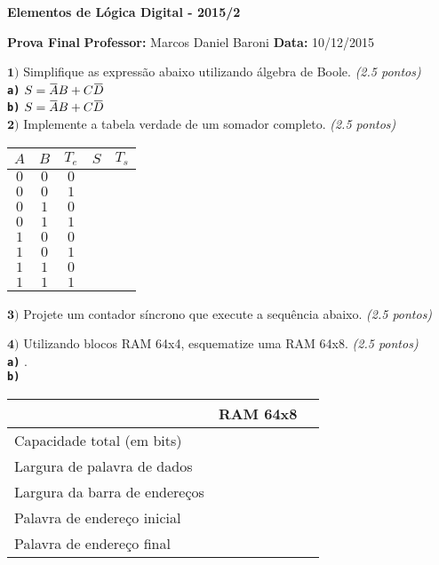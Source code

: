 \documentclass[12pt]{article}
\newcommand{\exerc}[3]{ \vspace*{25pt} {$\mathbf{#1)}$} #2 \hfill {\it #3} }
\newcommand{\exitem}[2]{ \texttt{\bf #1)} #2 \\ }
\renewcommand{\neg}[1]{ 
  \mkern 1.5mu\overline{\mkern-1.5mu#1\mkern-1.5mu}\mkern 1.5mu
}
\begin{document}

\begin{center}
{\Large \bf Elementos de Lógica Digital - 2015/2}
\end{center}
{\large \bf Prova Final}
{\bf Professor:} Marcos Daniel Baroni
{\bf Data:} 10/12/2015

\exerc{1}{Simplifique as expressão abaixo utilizando álgebra de Boole.}{(2.5 pontos)}
\\ \hspace*{3em} \exitem{a}{ $S = \neg{A}B + C\neg{D}$ }
   \hspace*{3em} \exitem{b}{ $S = \neg{A}B + C\neg{D}$ }

\exerc{2}{Implemente a tabela verdade de um somador completo.}{(2.5 pontos)}
\begin{multicols}{2}
  \begin{tabular}{|c|c|c||c|c|}
    \hline
    $A$ & $B$ & $T_e$ & $S$ & $T_s$ \\ \hline
    $0$ & $0$ & $0$ & & \\ \hline
    $0$ & $0$ & $1$ & & \\ \hline
    $0$ & $1$ & $0$ & & \\ \hline
    $0$ & $1$ & $1$ & & \\ \hline
    $1$ & $0$ & $0$ & & \\ \hline
    $1$ & $0$ & $1$ & & \\ \hline
    $1$ & $1$ & $0$ & & \\ \hline
    $1$ & $1$ & $1$ & & \\ \hline
  \end{tabular}
\end{multicols}

\exerc{3}{Projete um contador síncrono que execute a sequência abaixo.}{(2.5 pontos)}

\exerc{4}{Utilizando blocos RAM 64x4, esquematize uma RAM 64x8.}{(2.5 pontos)}
\\ \exitem{a}{.}
   \exitem{b}{
\begin{tabular}{|l|c|c|}
 \cline{2-2}
 \multicolumn{1}{c|}{} & {\bf RAM 64x8} \\ \hline
 Capacidade total (em bits) & \phantom{aaaaaaaaaaaaaa} \\ \hline
 Largura de palavra de dados & \\ \hline
 Largura da barra de endereços & \\ \hline
 Palavra de endereço inicial & \\ \hline
 Palavra de endereço final & \\ \hline
\end{tabular}
}

\end{document}
